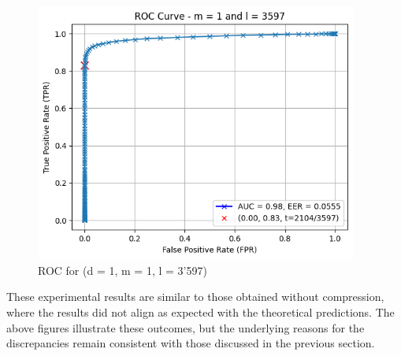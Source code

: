 \begin{enumerate}
\begin{itemize}
            \begin{figure}[H]
                \centering
                \includegraphics[width=\linewidth,height=8.5cm,keepaspectratio]{latex-img/FNR-FPR_ROC_config3_compression.png}
                \caption{ROC for (d = 1, m = 1, l = 3'597)}
                \label{FNR-FPR_ROC_TPR_config2}
            \end{figure}
        \end{itemize}
\end{enumerate}

These experimental results are similar to those obtained without compression, where the results did not align as expected with the theoretical predictions. The above figures illustrate these outcomes, but the underlying reasons for the discrepancies remain consistent with those discussed in the previous section.
